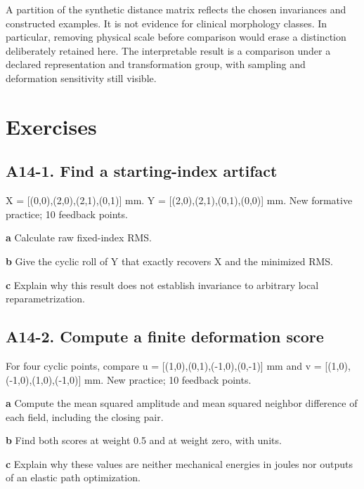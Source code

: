 \documentclass[11pt,letterpaper]{article}
\theoremstyle{definition}\newtheorem{definition}{Definition}\newtheorem{example}{Example}
\numberwithin{equation}{section}
\begin{document}
A partition of the synthetic distance matrix reflects the chosen invariances and constructed examples. It is not evidence for clinical morphology classes. In particular, removing physical scale before comparison would erase a distinction deliberately retained here. The interpretable result is a comparison under a declared representation and transformation group, with sampling and deformation sensitivity still visible.
\bigskip
\section*{Exercises}
\par\noindent\begin{minipage}{\linewidth}
\subsection*{A14-1. Find a starting-index artifact}
X =\allowbreak{} [(0,0),(2,0),(2,1),(0,1)] mm. Y =\allowbreak{} [(2,0),(2,1),(0,1),(0,0)] mm. New formative practice; 10 feedback points.

\textbf{a} Calculate raw fixed-index RMS.

\end{minipage}\par\medskip
\textbf{b} Give the cyclic roll of Y that exactly recovers X and the minimized RMS.

\textbf{c} Explain why this result does not establish invariance to arbitrary local reparametrization.

\par\noindent\begin{minipage}{\linewidth}
\subsection*{A14-2. Compute a finite deformation score}
For four cyclic points, compare u =\allowbreak{} [(1,0),(0,1),(-1,0),(0,-1)] mm and v =\allowbreak{} [(1,0),(-1,0),(1,0),(-1,0)] mm. New practice; 10 feedback points.

\textbf{a} Compute the mean squared amplitude and mean squared neighbor difference of each field, including the closing pair.

\end{minipage}\par\medskip
\textbf{b} Find both scores at weight 0.5 and at weight zero, with units.

\textbf{c} Explain why these values are neither mechanical energies in joules nor outputs of an elastic path optimization.
\end{document}
